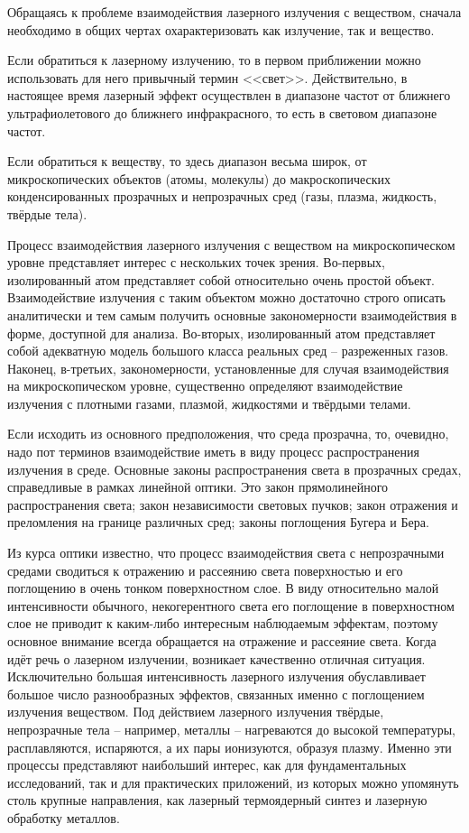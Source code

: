 
Обращаясь к проблеме взаимодействия лазерного излучения с веществом, сначала 
необходимо в общих чертах охарактеризовать как излучение, так и вещество.

Если обратиться к лазерному излучению, то в первом приближении можно 
использовать для него привычный термин <<свет>>. Действительно, в настоящее 
время лазерный эффект осуществлен в диапазоне частот от ближнего 
ультрафиолетового до ближнего инфракрасного, то есть в световом диапазоне 
частот.

Если обратиться к веществу, то здесь диапазон весьма широк, от 
микроскопических объектов (атомы, молекулы) до макроскопических 
конденсированных прозрачных и непрозрачных сред (газы, плазма, жидкость, 
твёрдые тела).   

Процесс взаимодействия лазерного излучения с веществом на микроскопическом 
уровне представляет интерес с нескольких точек зрения. Во-первых, 
изолированный атом представляет собой относительно очень простой объект. 
Взаимодействие излучения с таким объектом можно достаточно строго описать 
аналитически и тем самым получить основные закономерности взаимодействия в 
форме, доступной для анализа. Во-вторых, изолированный атом представляет собой 
адекватную модель большого класса реальных сред -- разреженных газов. Наконец, 
в-третьих, закономерности, установленные для случая взаимодействия на 
микроскопическом уровне, существенно определяют взаимодействие излучения с 
плотными газами, плазмой, жидкостями и твёрдыми телами.

Если исходить из основного предположения, что среда прозрачна, то, очевидно, 
надо пот терминов взаимодействие иметь в виду процесс распространения 
излучения в среде. Основные законы распространения света в прозрачных средах, 
справедливые в рамках линейной оптики. Это закон прямолинейного 
распространения света; закон независимости световых пучков; закон отражения и 
преломления на границе различных сред; законы поглощения Бугера и Бера. 

Из курса оптики известно, что процесс взаимодействия света с непрозрачными 
средами сводиться к отражению и рассеянию света поверхностью и его поглощению 
в очень тонком поверхностном слое. В виду относительно малой интенсивности 
обычного, некогерентного света его поглощение в поверхностном слое не приводит 
к каким-либо интересным наблюдаемым эффектам, поэтому основное внимание всегда 
обращается на отражение и рассеяние света. Когда идёт речь о лазерном 
излучении, возникает качественно отличная ситуация. Исключительно большая 
интенсивность лазерного излучения обуславливает большое число разнообразных 
эффектов, связанных именно с поглощением излучения веществом. Под действием 
лазерного излучения твёрдые, непрозрачные тела -- например, металлы -- 
нагреваются до высокой температуры, расплавляются, испаряются, а их пары 
ионизуются, образуя плазму. Именно эти процессы представляют наибольший 
интерес, как для фундаментальных исследований, так и для практических 
приложений, из которых можно упомянуть столь крупные направления, как лазерный 
термоядерный синтез и лазерную обработку металлов.  